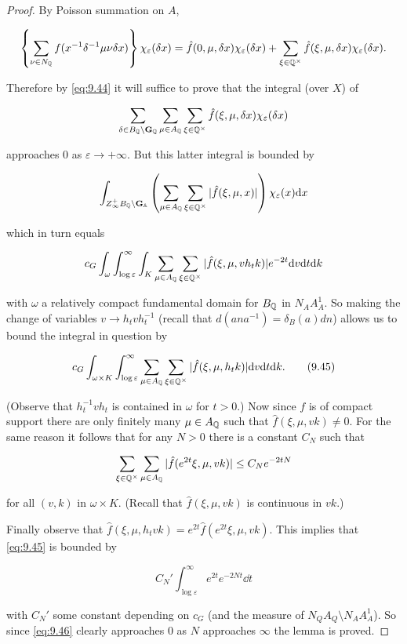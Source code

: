 \begin{proof}

By Poisson summation on $A$,

\[
\left\{\sum_{\nu \in N_{\mathbb{Q}}} f(x^{-1}\delta^{-1}\mu\nu\delta x)\right\}\chi_\varepsilon(\delta x) = \hat{f}(0, \mu, \delta x)\chi_\varepsilon(\delta x) + \sum_{\xi \in \mathbb{Q}^{\times}} \hat{f}(\xi, \mu, \delta x)\chi_\varepsilon(\delta x).
\]

Therefore by \eqref{eq:9.44} it will suffice to prove that the integral (over $X$) of

\[
\sum_{\delta \in B_{\mathbb{Q}} \backslash \mathbf{G}_{\mathbb{Q}}}\sum_{\mu \in A_{\mathbb{Q}}}\sum_{\xi \in \mathbb{Q}^{\times}} \hat{f}(\xi, \mu, \delta x)\chi_\varepsilon(\delta x)
\]

approaches 0 as $\varepsilon \to +\infty$. But this latter integral is bounded by

\[
\int_{Z_\infty^{+}B_{\mathbb{Q}} \backslash \mathbf{G}_{\mathbb{A}}}\left(\sum_{\mu \in A_{\mathbb{Q}}}\sum_{\xi \in \mathbb{Q}^{\times}} |\hat{f}(\xi, \mu, x)|\right)\chi_\varepsilon(x)\mathrm{d} x
\]

which in turn equals

\[
c_G\int_\omega\int_{\log \varepsilon}^{\infty}\int_K \sum_{\mu \in A_{\mathbb{Q}}}\sum_{\xi \in \mathbb{Q}^{\times}} |\hat{f}(\xi, \mu, vh_tk)|e^{-2t}\mathrm{d} v\mathrm{d} t\mathrm{d} k
\]

with $\omega$ a relatively compact fundamental domain for $B_{\mathbb{Q}}$ in $N_A A_A^1$. So making the change of variables $v \to h_tvh_t^{-1}$ (recall that $d(ana^{-1}) = \delta_B(a)dn$) allows us to bound the integral in question by

\begin{equation}\label{eq:9.45}
c_G\int_{\omega \times K}\int_{\log \varepsilon}^{\infty}\sum_{\mu \in A_{\mathbb{Q}}}\sum_{\xi \in \mathbb{Q}^{\times}} |\hat{f}(\xi, \mu, h_tk)|\mathrm{d} v\mathrm{d} t\mathrm{d} k.\tag{9.45}
\end{equation}

(Observe that $h_t^{-1}vh_t$ is contained in $\omega$ for $t > 0$.) Now since $f$ is of compact support there are only finitely many $\mu \in A_{\mathbb{Q}}$ such that $\hat{f}(\xi, \mu, vk) \neq 0$. For the same reason it follows that for any $N > 0$ there is a constant $C_N$ such that

\[
\sum_{\xi \in \mathbb{Q}^{\times}}\sum_{\mu \in A_{\mathbb{Q}}} |\hat{f}(e^{2t}\xi, \mu, vk)| \leq C_Ne^{-2tN}
\]

for all $(v, k)$ in $\omega \times K$. (Recall that $\hat{f}(\xi, \mu, vk)$ is continuous in $vk$.)

Finally observe that $\hat{f}(\xi, \mu, h_tvk) = e^{2t}\hat{f}(e^{2t}\xi, \mu, vk)$. This implies that \eqref{eq:9.45} is bounded by

\begin{equation}\label{eq:9.46}
C_N'\int_{\log \varepsilon}^{\infty} e^{2t}e^{-2Nt}\dd t\tag{9.46}
\end{equation}

with $C_N'$ some constant depending on $c_G$ (and the measure of $N_Q A_Q \setminus N_A A_A^1$). So since \eqref{eq:9.46} clearly approaches 0 as $N$ approaches $\infty$ the lemma is proved.

\end{proof}

